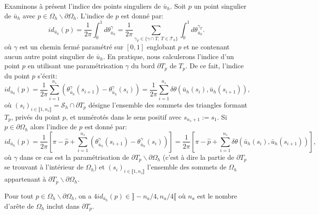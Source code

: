 Examinons à présent l'indice des points singuliers de $\bar{u}_h$. Soit $p$ un point singulier de $\bar{u}_h$ avec $p\in\Omega_h\backslash\partial\Omega_h$. L'indice de $p$ est donné par:
$$
id_{\bar{u}_h}(p)=\frac{1}{2\pi}\int_0^1 d\theta^\gamma_{\bar{u}_h}=\frac{1}{2\pi}\sum_{\gamma_T\in\{\gamma\cap T,~T\in\mathcal{T}_h\}}\int_0^1 d\theta^{\gamma_T}_{\bar{u}_h}.
$$
où $\gamma$ est un chemin fermé paramétré sur $[0, 1]$ englobant $p$ et ne contenant aucun autre point singulier de $\bar{u}_h$. En pratique, nous calculerons l'indice d'un point $p$ en utilisant une paramétrisation $\gamma$ du bord $\partial T_p$ de $T_p$. De ce fait, l'indice du point $p$ s'écrit:
\begin{equation}
    \label{eqn:ind_int}
    id_{\bar{u}_h}(p)=\displaystyle\frac{1}{2\pi}\displaystyle\sum_{i=1}^{n_s}\left(\theta^\gamma_{\bar{u}_h}(s_{i+1})-\theta^\gamma_{\bar{u}_h}(s_i)\right)=\displaystyle\frac{1}{2\pi}\sum_{i=1}^{n_s}\delta\theta(\bar{u}_h(s_i),\bar{u}_h(s_{i+1})),
\end{equation}
où $(s_i)_{i\in\llbracket 1, n_s\rrbracket}=\mathcal{S}_h\cap\partial T_p$ désigne l'ensemble des sommets des triangles formant $T_p$, privés du point $p$, et numérotés dans le sens positif avec $s_{n_s+1}:=s_1$.
Si $p\in\partial\Omega_h$ alors l'indice de $p$ est donné par:
\begin{equation}
    \label{eqn:ind_bord}
    id_{\bar{u}_h}(p)=\displaystyle\frac{1}{2\pi}\left[\pi-\widehat{p}+\displaystyle\sum_{i=1}^{n_s}\left(\theta^\gamma_{\bar{u}_h}(s_{i+1})-\theta^\gamma_{\bar{u}_h}(s_i)\right)\right]=\displaystyle\frac{1}{2\pi}\left[\pi-\widehat{p}+\displaystyle\sum_{i=1}^{n_s}\delta\theta(\bar{u}_h(s_i),\bar{u}_h(s_{i+1}))\right],
\end{equation}
où $\gamma$ dans ce cas est la paramétrisation de $\partial T_p\backslash\partial\Omega_h$ (c'est à dire la partie de $\partial T_p$ se trouvant à l'intérieur de $\Omega_h$) et $(s_i)_{i\in\llbracket 1, n_s\rrbracket}$ l'ensemble des sommets de $\Omega_h$ appartenant à $\partial T_p\backslash\partial\Omega_h$.

\begin{proposition}
    Pour tout $p\in\Omega_h\backslash\partial\Omega_h$, on a $4id_{\bar{u}_h}(p)\in\rrbracket -n_a/4, n_a/4\llbracket$ où $n_a$ est le nombre d'arête de $\Omega_h$ inclut dans $\partial T_p$.
\end{proposition}

